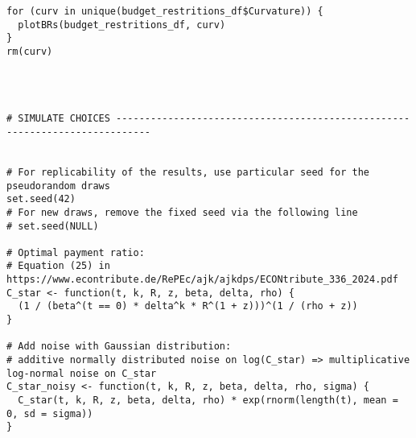 \documentclass[12pt, a4paper, oneside]{article}
\theoremstyle{Plain}
\theoremstyle{Definition}
\theoremstyle{Remark}
\begin{document}
\begin{appendix}
\begin{lstlisting}
for (curv in unique(budget_restritions_df$Curvature)) {
  plotBRs(budget_restritions_df, curv)
}
rm(curv)




# SIMULATE CHOICES ----------------------------------------------------------------------------


# For replicability of the results, use particular seed for the pseudorandom draws
set.seed(42)
# For new draws, remove the fixed seed via the following line
# set.seed(NULL)

# Optimal payment ratio:
# Equation (25) in https://www.econtribute.de/RePEc/ajk/ajkdps/ECONtribute_336_2024.pdf
C_star <- function(t, k, R, z, beta, delta, rho) {
  (1 / (beta^(t == 0) * delta^k * R^(1 + z)))^(1 / (rho + z))
}

# Add noise with Gaussian distribution:
# additive normally distributed noise on log(C_star) => multiplicative log-normal noise on C_star
C_star_noisy <- function(t, k, R, z, beta, delta, rho, sigma) {
  C_star(t, k, R, z, beta, delta, rho) * exp(rnorm(length(t), mean = 0, sd = sigma))
}


\end{lstlisting}
\end{appendix}
\end{document}
